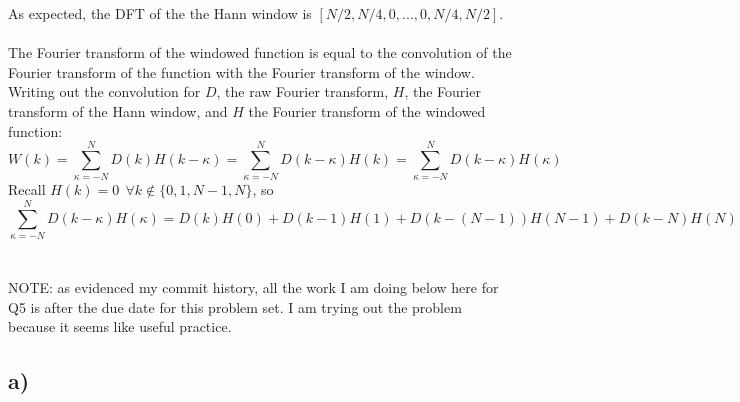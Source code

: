\documentclass{article}
\newcommand{\<}[1]{\left\langle #1 \right\rangle }
\begin{document}
As expected, the DFT of the the Hann window is $[N/2, N/4, 0, ..., 0, N/4, N/2]$.\\
\\
The Fourier transform of the windowed function is equal to the convolution of the Fourier transform of the function with the Fourier transform of the window. Writing out the convolution for $D$, the raw Fourier transform, $H$, the Fourier transform of the Hann window, and $H$ the Fourier transform of the windowed function:
\[W(k) = \sum_{\kappa=-N}^N D(k)H(k - \kappa) = \sum_{\kappa=-N}^N D(k-\kappa)H(k) = \sum_{\kappa=-N}^N D(k-\kappa)H(\kappa)\]
Recall $H(k) = 0 \ \ \forall k \notin \{0, 1, N-1, N\}$, so
\[\sum_{\kappa=-N}^N D(k-\kappa)H(\kappa) = D(k)H(0) + D(k-1)H(1) + D(k-(N-1))H(N-1) + D(k-N)H(N) \]


\section{}
NOTE: as evidenced  my commit history, all the work I am doing below here for Q5 is after the due date for this problem set. I am trying out the problem because it seems like useful practice. 

\subsection{a)}





	
\end{document}
